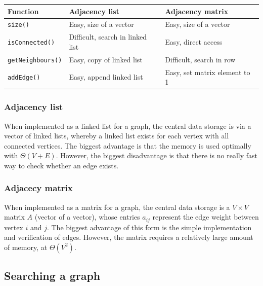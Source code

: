\begin{table}[H]
    \centering
    \begin{tabular}{p{30mm} | p{50mm} | p{50mm}}
        \toprule
        \textbf{Function} & \textbf{Adjacency list} & \textbf{Adjacency matrix} \\
        \midrule
        \lstinline|size()| & Easy, size of a vector & Easy, size of a vector \\
        \midrule
        \lstinline|isConnected()| & Difficult, search in linked list & Easy, direct access \\
        \midrule
        \lstinline|getNeighbours()| & Easy, copy of linked list & Difficult, search in row \\
        \midrule
        \lstinline|addEdge()| & Easy, append linked list & Easy, set matrix element to 1 \\
        \bottomrule
    \end{tabular}
\end{table}

\subsubsection{Adjacency list}

When implemented as a linked list for a graph, the central data storage is via a vector of linked lists, whereby a linked list exists for each vertex with all connected vertices. The biggest advantage is that the memory is used optimally with $\Theta(V+E)$. However, the biggest disadvantage is that there is no really fast way to check whether an edge exists.

%

\subsubsection{Adjacecy matrix}

When implemented as a matrix for a graph, the central data storage is a $V\times V$ matrix $A$ (vector of a vector), whose entries $a_{ij}$ represent the edge weight between vertex $i$ and $j$. The biggest advantage of this form is the simple implementation and verification of edges. However, the matrix requires a relatively large amount of memory, at $\Theta(V^2)$.

%

\subsection{Searching a graph}

